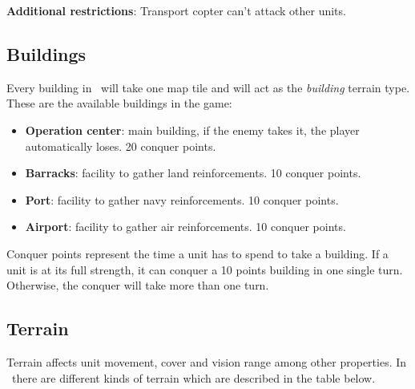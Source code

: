 \textbf{Additional restrictions}: Transport copter can't attack other units.\\

\subsection{Buildings}


Every building in \game\ will take one map tile and will act as the
\textit{building} terrain type. These are the available buildings in
the game:

\begin{itemize}
    \item \textbf{Operation center}: main building, if the enemy takes it, the
    player automatically loses. 20 conquer points.
    \item \textbf{Barracks}: facility to gather land reinforcements. 10 conquer
    points.
    \item \textbf{Port}: facility to gather navy reinforcements. 10 conquer
    points.
    \item \textbf{Airport}: facility to gather air reinforcements. 10 conquer
    points.
\end{itemize}

Conquer points represent the time a unit has to spend to take a building. If a
unit is at its full strength, it can conquer a 10 points building in one single
turn. Otherwise, the conquer will take more than one turn.\\

\subsection{Terrain}


Terrain affects unit movement, cover and vision range among other properties.
In \game\ there are different kinds of terrain which are described in the table
below.\\

